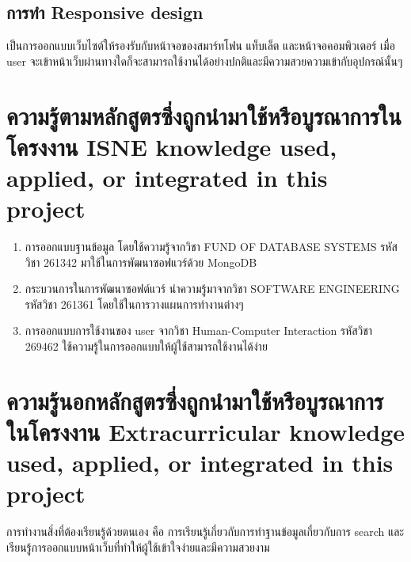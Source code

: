 \subsection{การทำ Responsive design}
เป็นการออกแบบเว็บไซต์ให้รองรับกับหน้าจอของสมาร์ทโฟน แท็บเล็ต และหน้าจอคอมพิวเตอร์ เมื่อ user จะเข้าหน้าเว็บผ่านทางใดก็จะสามารถใช้งานได้อย่างปกติและมีความสวยความเข้ากับอุปกรณ์นั้นๆ 

\section{\ifcpe%
ความรู้ตามหลักสูตรซึ่งถูกนำมาใช้หรือบูรณาการในโครงงาน
\else%
ISNE knowledge used, applied, or integrated in this project
\fi
}
\begin{enumerate}
    \item การออกแบบฐานข้อมูล โดยใช้ความรู้จากวิชา FUND OF DATABASE SYSTEMS รหัส
วิชา 261342 มาใช้ในการพัฒนาซอฟแวร์ด้วย MongoDB
    \item กระบวนการในการพัฒนาซอฟต์แวร์ นำความรู้มาจากวิชา SOFTWARE
ENGINEERING รหัสวิชา 261361 โดยใช้ในการวางแผนการทำงานต่างๆ
    \item การออกแบบการใช้งานของ user จากวิชา Human-Computer Interaction รหัสวิชา 269462 ใช้ความรู้ในการออกแบบให้ผู้ใช้สามารถใช้งานได้ง่าย
\end{enumerate}

\section{\ifcpe%
ความรู้นอกหลักสูตรซึ่งถูกนำมาใช้หรือบูรณาการในโครงงาน
\else%
Extracurricular knowledge used, applied, or integrated in this project
\fi
}

การทำงานสิ่งที่ต้องเรียนรู้ด้วยตนเอง คือ การเรียนรู้เกี่ยวกับการทำฐานข้อมูลเกี่ยวกับการ search และเรียนรู้การออกแบบหน้าเว็บที่ทำให้ผู้ใช้เข้าใจง่ายและมีความสวยงาม 
